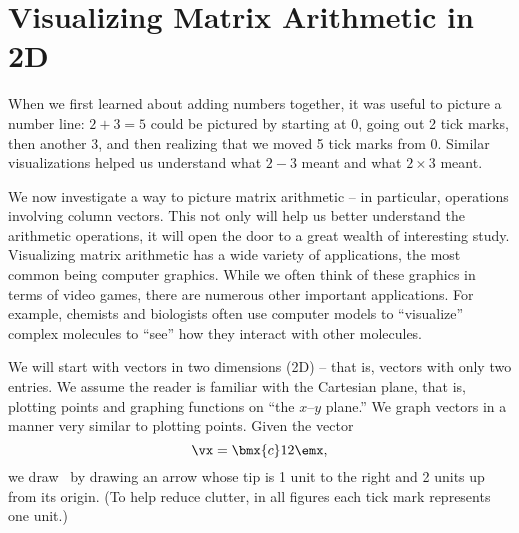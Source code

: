 \section{Visualizing Matrix Arithmetic in 2D}\label{sec:geom_1}




When we first learned about adding numbers together, it was useful to picture a number line: $2+3=5$ could be pictured by starting at 0, going out 2 tick marks, then another 3, and then realizing that we moved 5 tick marks from 0. Similar visualizations helped us understand what $2-3$ meant and what $2\times 3$ meant.


We now investigate a way to picture matrix arithmetic -- in particular, operations involving column vectors. This not only will help us better understand the arithmetic operations, it will open the door to a great wealth of interesting study. Visualizing matrix arithmetic has a wide variety of applications, the most common being computer graphics. While we often think of these graphics in terms of video games, there are numerous other important applications. For example, chemists and biologists often use computer models to ``visualize'' complex molecules to ``see'' how they interact with other molecules.%


We will start with vectors in two dimensions (2D) -- that is, vectors with only two entries. We assume the reader is familiar with the Cartesian plane, that is, plotting points and graphing functions on ``the $x$--$y$ plane.'' We graph vectors in a manner very similar to plotting points. Given the vector 
\[
\vx = \bmx{c}1\\2\emx,
\]
we draw \vx\ by drawing an arrow whose tip is 1 unit to the right and 2 units up from its origin. (To help reduce clutter, in all figures each tick mark represents one unit.)

